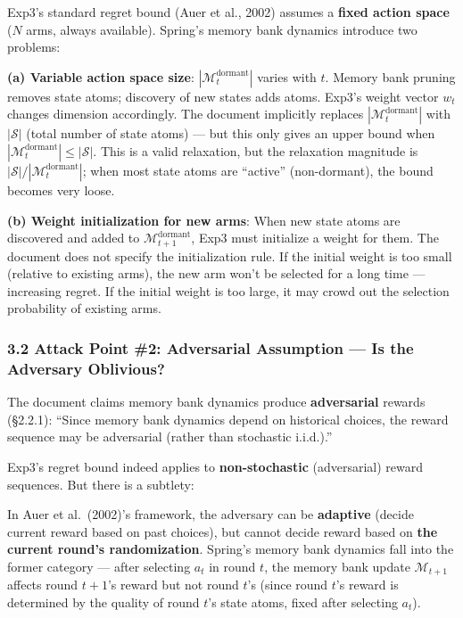 \documentclass[
  12pt,
]{article}
\begin{document}
Exp3's standard regret bound (Auer et al., 2002) assumes a \textbf{fixed action space} ($N$ arms, always available). Spring's memory bank dynamics introduce two problems:

\textbf{(a) Variable action space size}: $|\mathcal{M}_t^{\text{dormant}}|$ varies with $t$. Memory bank pruning removes state atoms; discovery of new states adds atoms. Exp3's weight vector $w_t$ changes dimension accordingly. The document implicitly replaces $|\mathcal{M}_t^{\text{dormant}}|$ with $|\mathcal{S}|$ (total number of state atoms) --- but this only gives an upper bound when $|\mathcal{M}_t^{\text{dormant}}| \leq |\mathcal{S}|$. This is a valid relaxation, but the relaxation magnitude is $|\mathcal{S}| / |\mathcal{M}_t^{\text{dormant}}|$; when most state atoms are ``active'' (non-dormant), the bound becomes very loose.

\textbf{(b) Weight initialization for new arms}: When new state atoms are discovered and added to $\mathcal{M}_{t+1}^{\text{dormant}}$, Exp3 must initialize a weight for them. The document does not specify the initialization rule. If the initial weight is too small (relative to existing arms), the new arm won't be selected for a long time --- increasing regret. If the initial weight is too large, it may crowd out the selection probability of existing arms.

\subsubsection{3.2 Attack Point \#2: Adversarial Assumption --- Is the Adversary Oblivious?}\label{attack-2-adversarial}

The document claims memory bank dynamics produce \textbf{adversarial} rewards (\S2.2.1): ``Since memory bank dynamics depend on historical choices, the reward sequence may be adversarial (rather than stochastic i.i.d.).''

Exp3's regret bound indeed applies to \textbf{non-stochastic} (adversarial) reward sequences. But there is a subtlety:

In Auer et al.~(2002)'s framework, the adversary can be \textbf{adaptive} (decide current reward based on past choices), but cannot decide reward based on \textbf{the current round's randomization}. Spring's memory bank dynamics fall into the former category --- after selecting $a_t$ in round $t$, the memory bank update $\mathcal{M}_{t+1}$ affects round $t+1$'s reward but not round $t$'s (since round $t$'s reward is determined by the quality of round $t$'s state atoms, fixed after selecting $a_t$).
\end{document}
